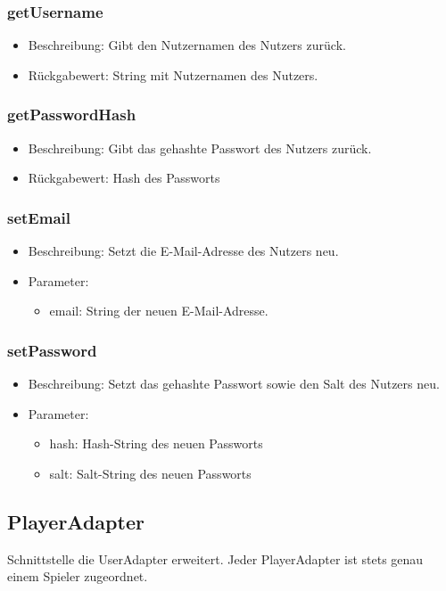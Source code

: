 \documentclass[a4paper]{scrreprt}
\begin{document}
	\subsubsection{getUsername}
	\begin{itemize}
		\item Beschreibung: Gibt den Nutzernamen des Nutzers zurück.
		\item Rückgabewert: String mit Nutzernamen des Nutzers.
	\end{itemize}

	\subsubsection{getPasswordHash}
	\begin{itemize}
		\item Beschreibung: Gibt das gehashte Passwort des Nutzers zurück.
		\item Rückgabewert: Hash des Passworts
	\end{itemize}

	\subsubsection{setEmail}
	\begin{itemize}
		\item Beschreibung: Setzt die E-Mail-Adresse des Nutzers neu.
		\item Parameter:
		\begin{itemize}
			\item email: String der neuen E-Mail-Adresse.
		\end{itemize}
	\end{itemize}

	\subsubsection{setPassword}
	\begin{itemize}
		\item Beschreibung: Setzt das gehashte Passwort sowie den Salt des Nutzers neu.
		\item Parameter:
		\begin{itemize}
			\item hash: Hash-String des neuen Passworts
			\item salt: Salt-String des neuen Passworts
		\end{itemize}
	\end{itemize}

	\subsection{PlayerAdapter}
	Schnittstelle die UserAdapter erweitert.
	Jeder PlayerAdapter ist stets genau einem Spieler zugeordnet.
\end{document}
